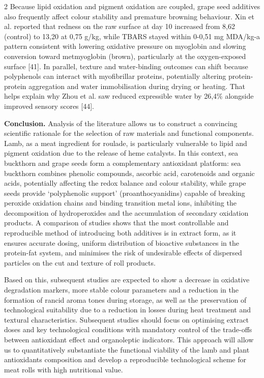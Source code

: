 \begin{multicols}{2}
Because lipid oxidation and pigment oxidation are coupled, grape seed
additives also frequently affect colour stability and premature browning
behaviour. Xin et al. reported that redness on the raw surface at day 10
increased from 8,62 (control) to 13,20 at 0,75 g/kg, while TBARS stayed
within 0-0,51 mg MDA/kg-a pattern consistent with lowering oxidative
pressure on myoglobin and slowing conversion toward metmyoglobin
(brown), particularly at the oxygen-exposed surface {[}41{]}. In
parallel, texture and water-binding outcomes can shift because
polyphenols can interact with myofibrillar proteins, potentially
altering protein-protein aggregation and water immobilisation during
drying or heating. That helps explain why Zhou et al. saw reduced
expressible water by 26,4\% alongside improved sensory scores {[}44{]}.

{\bfseries Conclusion.} Analysis of the literature allows us to construct a
convincing scientific rationale for the selection of raw materials and
functional components. Lamb, as a meat ingredient for roulade, is
particularly vulnerable to lipid and pigment oxidation due to the
release of heme catalysts. In this context, sea buckthorn and grape
seeds form a complementary antioxidant platform: sea buckthorn combines
phenolic compounds, ascorbic acid, carotenoids and organic acids,
potentially affecting the redox balance and colour stability, while
grape seeds provide `polyphenolic support' (proanthocyanidins) capable
of breaking peroxide oxidation chains and binding transition metal ions,
inhibiting the decomposition of hydroperoxides and the accumulation of
secondary oxidation products. A comparison of studies shows that the
most controllable and reproducible method of introducing both additives
is in extract form, as it ensures accurate dosing, uniform distribution
of bioactive substances in the protein-fat system, and minimises the
risk of undesirable effects of dispersed particles on the cut and
texture of roll products.

Based on this, subsequent studies are expected to show a decrease in
oxidative degradation markers, more stable colour parameters and a
reduction in the formation of rancid aroma tones during storage, as well
as the preservation of technological suitability due to a reduction in
losses during heat treatment and textural characteristics. Subsequent
studies should focus on optimising extract doses and key technological
conditions with mandatory control of the trade-offs between antioxidant
effect and organoleptic indicators. This approach will allow us to
quantitatively substantiate the functional viability of the lamb and
plant antioxidants composition and develop a reproducible technological
scheme for meat rolls with high nutritional value.
\end{multicols}

